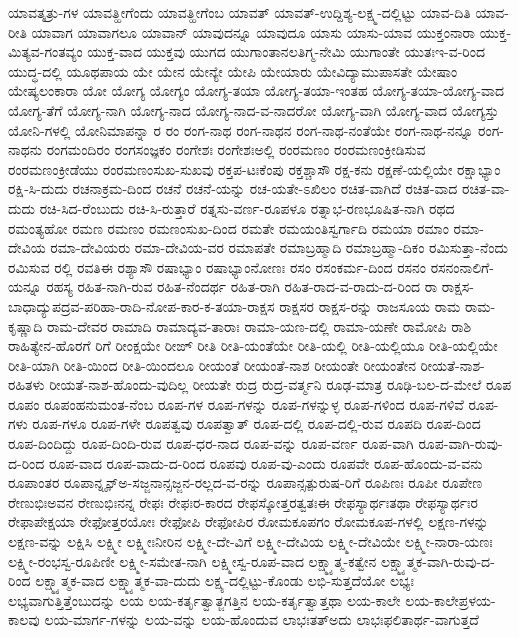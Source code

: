 {ಯಾವತ್ಶತ್ರು-ಗಳ
ಯಾವತ್ಹೀಗೆಂದು
ಯಾವತ್ಹೀಗೆಂಬ
ಯಾವತ್‌
ಯಾವತ್‌-ಉದ್ದಿಶ್ಯ-ಲಕ್ಷ್ಮ-ದಲ್ಲಿಟ್ಟು
ಯಾವ-ದಿತಿ
ಯಾವ-ರೀತಿ
ಯಾವಾಗ
ಯಾವಾಗಲೂ
ಯಾವಾನ್
ಯಾವುದನ್ನೂ
ಯಾವುದೂ
ಯಾಸು
ಯಾಸು-ಯಾವ
ಯುಕ್ತಂನಾರಾ
ಯುಕ್ತ-ಮಿತ್ಯವ-ಗಂತವ್ಯಂ
ಯುಕ್ತ-ವಾದ
ಯುಕ್ತವು
ಯುಗದ
ಯುಗಾಂತಾನಲತಿಗ್ಮ-ನೇಮಿ
ಯುಗಾಂತೇ
ಯುತಃಇ-ವ-ರಿಂದ
ಯುದ್ಧ-ದಲ್ಲಿ
ಯೂಥಪಾಯ
ಯೇ
ಯೇನ
ಯೇನ್ಯೇ
ಯೇಪಿ
ಯೇಯಾರು
ಯೇವಿದ್ಯಾಮುಪಾಸತೇ
ಯೇಷಾಂ
ಯೇಷ್ಯಲಂಕಾರಾ
ಯೋ
ಯೋಗ್ಯ
ಯೋಗ್ಯಂ
ಯೋಗ್ಯ-ತಯಾ
ಯೋಗ್ಯ-ತಯಾ-ಇಂತಹ
ಯೋಗ್ಯ-ತಯಾ-ಯೋಗ್ಯ-ವಾದ
ಯೋಗ್ಯ-ತೆಗೆ
ಯೋಗ್ಯ-ನಾಗಿ
ಯೋಗ್ಯ-ನಾದ
ಯೋಗ್ಯ-ನಾದ-ವ-ನಾದರೋ
ಯೋಗ್ಯ-ವಾಗಿ
ಯೋಗ್ಯ-ವಾದ
ಯೋಗ್ಯಸ್ತು
ಯೋನಿ-ಗಳಲ್ಲಿ
ಯೋನಿಮಾಪನ್ನಾ
ರ
ರಂ
ರಂಗ-ನಾಥ
ರಂಗ-ನಾಥನ
ರಂಗ-ನಾಥ-ನಂತೆಯೇ
ರಂಗ-ನಾಥ-ನನ್ನೂ
ರಂಗ-ನಾಥನು
ರಂಗಮಂದಿರಂ
ರಂಗಸಂಜ್ಞಕಂ
ರಂಗೇಶಃ
ರಂಗೇಶಃಅಲ್ಲಿ
ರಂರಮಣಂ
ರಂರಮಣಂಕ್ರೀಡಿಸುವ
ರಂರಮಣಂಕ್ರೀಡೆಯು
ರಂರಮಣಂಸುಖ-ಸುಖವು
ರಕ್ತಪ-ಟಃಕೆಂಪು
ರಕ್ತಶ್ಚಾಸೌ
ರಕ್ಷ-ಕನು
ರಕ್ಷಣೆ-ಯಲ್ಲಿಯೇ
ರಕ್ಷಾಭ್ಯಾಂ
ರಕ್ಷಿ-ಸಿ-ದುದು
ರಚನಾಕ್ರಮ-ದಿಂದ
ರಚನೆ
ರಚನೆ-ಯನ್ನು
ರಚ-ಯತೇ-ಽಖಿಲಂ
ರಚಿತ-ವಾಗಿದೆ
ರಚಿತ-ವಾದ
ರಚಿತ-ವಾ-ದುದು
ರಚಿ-ಸಿದ-ರೆಂಬುದು
ರಚಿ-ಸಿ-ರುತ್ತಾರೆ
ರತ್ನಸು-ವರ್ಣ-ರೂಪಳೂ
ರತ್ನಾಭ-ರಣಭೂಷಿತ-ನಾಗಿ
ರಥದ
ರಮಂತ್ಯಹೋ
ರಮಣ
ರಮಣಂ
ರಮಣಂಸುಖ-ದಿಂದ
ರಮತೇ
ರಮಯಂತಿಸ್ವರ್ಗಾದಿ
ರಮಯಾ
ರಮಾಂ
ರಮಾ-ದೇವಿಯ
ರಮಾ-ದೇವಿಯರು
ರಮಾ-ದೇವಿಯ-ವರ
ರಮಾಪತೇ
ರಮಾಬ್ರಹ್ಮಾದಿ
ರಮಾಬ್ರಹ್ಮಾ-ದಿಕಂ
ರಮಿಸುತ್ತಾ-ನೆಂದು
ರಮಿಸುವ
ರಲ್ಲಿ
ರವತಿಈ
ರಶ್ಯಾಸೌ
ರಷಾಭ್ಯಾಂ
ರಷಾಭ್ಯಾಂನೋಣಃ
ರಸಂ
ರಸಂಕರ್ಮ-ದಿಂದ
ರಸನಂ
ರಸನಂನಾಲಿಗೆ-ಯನ್ನೂ
ರಹಸ್ಯ
ರಹಿತ-ನಾಗಿ-ರುವ
ರಹಿತ-ನೆಂದರ್ಥ
ರಹಿತ-ರಾಗಿ
ರಹಿತ-ರಾದ-ವ-ರಾದು-ದ-ರಿಂದ
ರಾ
ರಾಕ್ಷಸ-ಬಾಧಾದ್ಯುಪದ್ರವ-ಪರಿಹಾ-ರಾದಿ-ನೋಪ-ಕಾರ-ಕ-ತಯಾ-ರಾಕ್ಷಸ
ರಾಕ್ಷಸರ
ರಾಕ್ಷಸ-ರನ್ನು
ರಾಜಸೂಯ
ರಾಮ
ರಾಮ-ಕೃಷ್ಣಾದಿ
ರಾಮ-ದೇವರ
ರಾಮಾದಿ
ರಾಮಾದ್ಯವ-ತಾರಾಃ
ರಾಮಾ-ಯಣ-ದಲ್ಲಿ
ರಾಮಾ-ಯಣೇ
ರಾಮೋಪಿ
ರಾಶಿ
ರಾಹಿತ್ಯೇನ-ಹೊರಗೆ
ರಿಗೆ
ರೀಂಕ್ಷಯೇ
ರೀಙ್
ರೀತಿ
ರೀತಿ-ಯಂತೆಯೇ
ರೀತಿ-ಯಲ್ಲಿ
ರೀತಿ-ಯಲ್ಲಿಯೂ
ರೀತಿ-ಯಲ್ಲಿಯೇ
ರೀತಿ-ಯಾಗಿ
ರೀತಿ-ಯಿಂದ
ರೀತಿ-ಯಿಂದಲೂ
ರೀಯಂತೆ
ರೀಯಂತೆ-ನಾಶ
ರೀಯಂತೇ
ರೀಯಂತೇನ
ರೀಯತೆ-ನಾಶ-ರಹಿತಳು
ರೀಯತೆ-ನಾಶ-ಹೊಂದು-ವುದಿಲ್ಲ
ರೀಯತೇ
ರುದ್ರ
ರುದ್ರ-ವರ್ತ್ಮನಿ
ರೂಢ-ಮಾತ್ರ
ರೂಢಿ-ಬಲ-ದ-ಮೇಲೆ
ರೂಪ
ರೂಪಂ
ರೂಪಂಹನುಮಂತ-ನೆಂಬ
ರೂಪ-ಗಳ
ರೂಪ-ಗಳನ್ನು
ರೂಪ-ಗಳನ್ನುಳ್ಳ
ರೂಪ-ಗಳಿಂದ
ರೂಪ-ಗಳಿವೆ
ರೂಪ-ಗಳು
ರೂಪ-ಗಳೂ
ರೂಪ-ಗಳೇ
ರೂಪತ್ವವು
ರೂಪತ್ವಾತ್
ರೂಪ-ದಲ್ಲಿ
ರೂಪ-ದಲ್ಲಿ-ರುವ
ರೂಪದಿ
ರೂಪ-ದಿಂದ
ರೂಪ-ದಿಂದಿದ್ದು
ರೂಪ-ದಿಂದಿ-ರುವ
ರೂಪ-ಧರ-ನಾದ
ರೂಪ-ವನ್ನು
ರೂಪ-ವರ್ಣ
ರೂಪ-ವಾಗಿ
ರೂಪ-ವಾಗಿ-ರುವು-ದ-ರಿಂದ
ರೂಪ-ವಾದ
ರೂಪ-ವಾದು-ದ-ರಿಂದ
ರೂಪವು
ರೂಪ-ವು-ಎಂದು
ರೂಪವೇ
ರೂಪ-ಹೊಂದು-ವ-ವನು
ರೂಪಾಂತರ
ರೂಪಾನ್ನೄನ್ಅ-ಸಜ್ಜನಾನ್ಸಜ್ಜನ-ರಲ್ಲದ-ವ-ರನ್ನು
ರೂಪಾನ್ಸತ್ಪುರುಷ-ರಿಗೆ
ರೂಪಿಣಃ
ರೂಪೀ
ರೂಪೇಣ
ರೇಣುಭಿಃಅವನ
ರೇಣುಭಿಃನನ್ನ
ರೇಫಃ
ರೇಫಃರ-ಕಾರದ
ರೇಫಸ್ಕೋತ್ತರತ್ವತಃಈ
ರೇಫಸ್ಯಾರ್ಥಃತಥಾ
ರೇಫಸ್ಯಾರ್ಥಃರ
ರೇಫಾಪೇಕ್ಷಯಾ
ರೇಫೋತ್ತರಯೋಃ
ರೇಫೋಪಿ
ರೇಫೋಪಿರ
ರೋಮಕೂಪಗಂ
ರೋಮಕೂಪ-ಗಳಲ್ಲಿ
ಲಕ್ಷಣ-ಗಳನ್ನು
ಲಕ್ಷಣ-ವನ್ನು
ಲಕ್ಷಿಸಿ
ಲಕ್ಷ್ಮೀ
ಲಕ್ಷ್ಮೀಃನೀರಿನ
ಲಕ್ಷ್ಮೀ-ದೇ-ವಿಗೆ
ಲಕ್ಷ್ಮೀ-ದೇವಿಯ
ಲಕ್ಷ್ಮೀ-ದೇವಿಯೇ
ಲಕ್ಷ್ಮೀ-ನಾರಾ-ಯಣಃ
ಲಕ್ಷ್ಮೀ-ರಂಭಸ್ವ-ರೂಪಿಣೀ
ಲಕ್ಷ್ಮೀ-ಸಮೇತ-ನಾಗಿ
ಲಕ್ಷ್ಮೀಸ್ವ-ರೂಪ-ವಾದ
ಲಕ್ಷ್ಮ್ಯಾತ್ಮ-ಕತ್ವೇನ
ಲಕ್ಷ್ಮ್ಯಾತ್ಮಕ-ವಾಗಿ-ರುವು-ದ-ರಿಂದ
ಲಕ್ಷ್ಮ್ಯಾತ್ಮಕ-ವಾದ
ಲಕ್ಷ್ಮ್ಯಾತ್ಮಕ-ವಾ-ದುದು
ಲಕ್ಷ್ಯ-ದಲ್ಲಿಟ್ಟು-ಕೊಂಡು
ಲಭಿ-ಸುತ್ತದೆಯೋ
ಲಭ್ಯಃ
ಲಭ್ಯವಾಗುತ್ತಿತ್ತೆಂಬುದನ್ನು
ಲಯ
ಲಯ-ಕರ್ತೃತ್ವಾತ್ಜಗತ್ತಿನ
ಲಯ-ಕರ್ತೃತ್ವಾತ್ತಥಾ
ಲಯ-ಕಾಲೇ
ಲಯ-ಕಾಲೇಪ್ರಳಯ-ಕಾಲವು
ಲಯ-ಮಾರ್ಗ-ಗಳನ್ನು
ಲಯ-ವನ್ನು
ಲಯ-ಹೊಂದುವ
ಲಾಭಃತತ್ಅದು
ಲಾಭಃಫಲಿತಾರ್ಥ-ವಾಗುತ್ತದೆ
}
